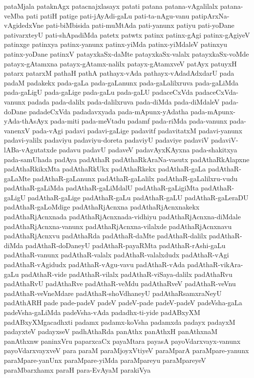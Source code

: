 {pataMjala
pataknAgx
patacnajxlasayx
patati
patana
patana-vAgalilalx
patana-veMba
pati
patiH
patige
pati-jAyAdi-gaLu
pati-ta-nAgu-vanu
patipArxNa-vAgidedxVne
pati-biMbisida
pati-muMtAda
pati-yanunx
patiyu
pati-yoDane
pativarxteyU
pati-shApadiMda
patetx
patwtx
patinx
patinx-gAgi
patinx-gAgiyeV
patinxge
patinxya
patinx-yanunx
patinx-yiMda
patinx-yiMdaleV
patinxyu
patinx-yoDane
patinxV
patayxkaSx-daMte
patayxkaSx-valalx
patayxkaSx-voMde
patayx-gAtamxna
patayx-gAtamx-nalilx
patayx-gAtamxveV
patAyx
patuyxH
patarx
patarxM
pathaH
pathA
pathayx-vAda
pathayx-vAdadAdxdarU
pada
padaM
padakekx
pada-gaLa
pada-gaLanunx
pada-gaLalilxruva
pada-gaLiMda
pada-gaLigU
pada-gaLige
pada-gaLu
pada-gaLU
padaceCxVda
padaceCxVda-vanunx
padada
pada-dalilx
pada-dalilxruva
pada-diMda
pada-diMdaleV
pada-doDane
padadeCxVda
padadavxyada
pada-mApunx-yAdatha
pada-mApunx-yAda-thAsAyx
pada-miti
pada-meVtadu
padamf
pada-riMda
pada-vanunx
pada-vanenxV
pada-vAgi
padavi
padavi-gaLige
padavitf
padavitatxM
padavi-yanunx
padavi-yalilx
padaviyu
padaviyu-doreta
padaviyU
padaviye
padaviV
padaviV-lABa-vAgutatxde
padavu
padavU
padaveV
padavAyxKAyxna
pada-shakitxya
pada-samUhada
padAya
padAthaR
padAthaRkAraNa-vasutx
padAthaRkAlapxne
padAthaRkikxMta
padAthaRkUkx
padAthaRkekx
padAthaR-gaLa
padAthaR-gaLaMte
padAthaR-gaLanunx
padAthaR-gaLalilx
padAthaR-gaLalilxru-vudu
padAthaR-gaLiMda
padAthaR-gaLiMdalU
padAthaR-gaLigiMta
padAthaR-gaLigU
padAthaR-gaLige
padAthaR-gaLu
padAthaR-gaLU
padAthaR-gaLeraDU
padAthaR-gaLoMdige
padAthaRjAcnxna
padAthaRjAcnxnakekx
padAthaRjAcnxnada
padAthaRjAcnxnada-vidhiyu
padAthaRjAcnxna-diMdale
padAthaRjAcnxna-vanunx
padAthaRjAcnxna-vilalxde
padAthaRjAcnxnavu
padAthaRjAcnxvu
padAthaRda
padAthaR-daMte
padAthaR-dalilx
padAthaR-diMda
padAthaR-doDaneyU
padAthaR-payaRMta
padAthaR-rAshi-gaLu
padAthaR-vanunx
padAthaR-valalx
padAthaR-valalxdudx
padAthaR-vAgi
padAthaR-vAgidudx
padAthaR-vAgu-vavu
padAthaR-vAda
padAthaR-vikAra-gaLu
padAthaR-vide
padAthaR-vilalx
padAthaR-viSaya-dalilx
padAthaRvu
padAthaRvU
padAthaRve
padAthaR-veMdu
padAthaRveV
padAthaR-veVnu
padAthaR-veVneMdare
padAthaR-shoVdhaneyU
padAthaRsamxraNeyU
padAthARH
pade
pade-padeV
padeV
padeV-pade
padeV-padeV
padeVsha-gaLa
padeVsha-gaLiMda
padeVsha-vAda
padadhx-ti-yide
padABxyXM
padABxyXMgacadhxti
padamx
padamx-koVsha
padamxda
padayx
padayxM
padayxteV
padayxseV
padhAthaRda
panAthx
panAthxH
panAthxnaM
panAthxnw
paninxVru
paparxcaCx
payaMtara
payasA
payoVdarxvayx-vanunx
payoVdarxvayxveV
para
paraM
paraMjoyxVtiyeV
paraMparA
paraMpare-yanunx
paraMpare-yanUnx
paraMpare-yiMda
paraMpareyu
paraMpareyeV
paraMbarxhamx
paraH
para-EvAyaM
parakiVya
}
